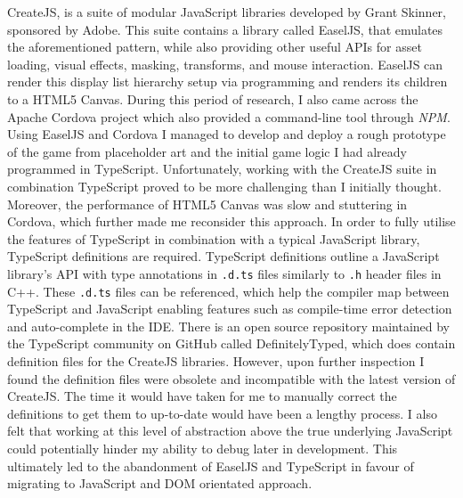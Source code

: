 \documentclass[final]{cmpreport}
\begin{document}
CreateJS, is a suite of modular JavaScript libraries developed by Grant Skinner, sponsored by Adobe. This suite contains a library called EaselJS, that emulates the aforementioned pattern, while also providing other useful APIs for asset loading, visual effects, masking, transforms, and mouse interaction. EaselJS can render this display list hierarchy setup via programming and renders its children to a HTML5 Canvas. During this period of research, I also came across the Apache Cordova project which also provided a command-line tool through \textit{NPM}. Using EaselJS and Cordova I managed to develop and deploy a rough prototype of the game from placeholder art and the initial game logic I had already programmed in TypeScript. Unfortunately, working with the CreateJS suite in combination TypeScript proved to be more challenging than I initially thought. Moreover, the performance of HTML5 Canvas was slow and stuttering in Cordova, which further made me reconsider this approach. In order to fully utilise the features of TypeScript in combination with a typical JavaScript library, TypeScript definitions are required. TypeScript definitions outline a JavaScript library's API with type annotations in \texttt{.d.ts} files similarly to \texttt{.h} header files in C++. These \texttt{.d.ts} files can be referenced, which help the compiler map between TypeScript and JavaScript enabling features such as compile-time error detection and auto-complete in the IDE. There is an open source repository maintained by the TypeScript community on GitHub called DefinitelyTyped\footnotemark[27] , which does contain definition files for the CreateJS libraries. However, upon further inspection I found the definition files were obsolete and incompatible with the latest version of CreateJS. The time it would have taken for me to manually correct the definitions to get them to up-to-date would have been a lengthy process. I also felt that working at this level of abstraction above the true underlying JavaScript could potentially hinder my ability to debug later in development. This ultimately led to the abandonment of EaselJS and TypeScript in favour of migrating to JavaScript and DOM orientated approach.

\end{document}
